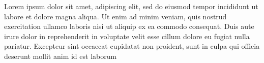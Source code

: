 \documentclass{article}
\begin{document}
\beginnumbering
\pstart
Lorem ipsum dolor sit amet, \startsub{} adipiscing elit, sed do eiusmod tempor incididunt ut labore et dolore magna aliqua. Ut enim ad minim veniam, quis nostrud exercitation ullamco laboris nisi ut aliquip ex ea commodo consequat. Duis aute irure dolor in reprehenderit in voluptate velit esse cillum dolore eu fugiat nulla pariatur. Excepteur sint occaecat cupidatat non proident, sunt in culpa qui officia deserunt mollit anim id est laborum
\pend
\endnumbering
%
\end{document}
